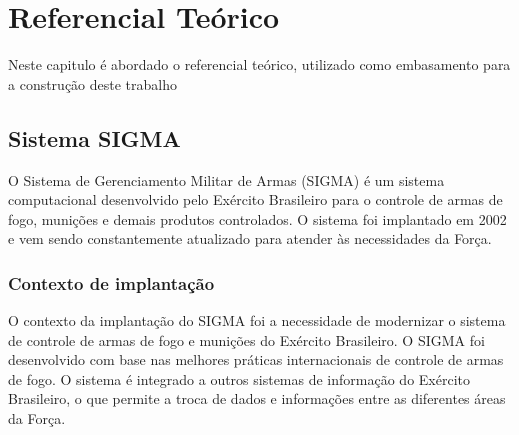 
 
\chapter{Referencial Teórico}\label{referecial_teorico}

Neste capitulo é abordado o referencial teórico, utilizado como embasamento para a construção deste trabalho
\section{Sistema SIGMA } 
O Sistema de Gerenciamento Militar de Armas (SIGMA) é um sistema computacional desenvolvido pelo Exército Brasileiro para o controle de armas de fogo, munições e demais produtos controlados. O sistema foi implantado em 2002 e vem sendo constantemente atualizado para atender às necessidades da Força.\cite{ExércitoBrasileiro}

\subsection{Contexto de implantação}
O contexto da implantação do SIGMA foi a necessidade de modernizar o sistema de controle de armas de fogo e munições do Exército Brasileiro.
O SIGMA foi desenvolvido com base nas melhores práticas internacionais de controle de armas de fogo. O sistema é integrado a outros sistemas de informação do Exército Brasileiro, o que permite a troca de dados e informações entre as diferentes áreas da Força.\cite{ExércitoBrasileiro}

